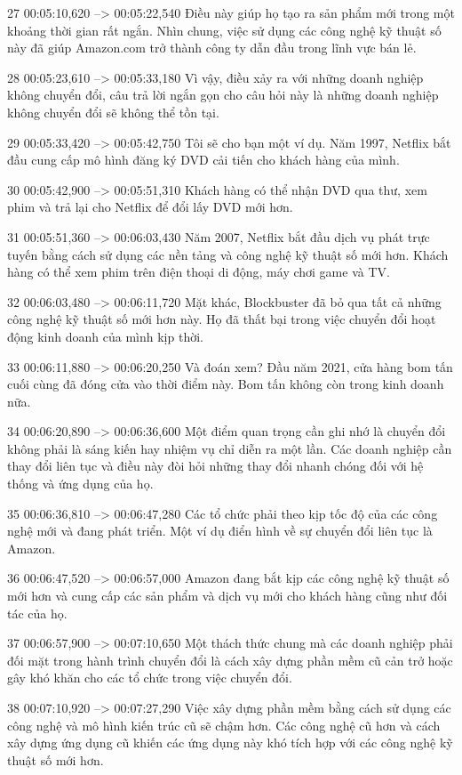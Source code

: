 27
00:05:10,620 --> 00:05:22,540
Điều này giúp họ tạo ra sản phẩm mới trong một khoảng thời gian rất ngắn.  Nhìn chung, việc sử dụng các công nghệ kỹ thuật số này đã giúp Amazon.com trở thành công ty dẫn đầu trong lĩnh vực bán lẻ.

28
00:05:23,610 --> 00:05:33,180
Vì vậy, điều xảy ra với những doanh nghiệp không chuyển đổi, câu trả lời ngắn gọn cho câu hỏi này là những doanh nghiệp không chuyển đổi sẽ không thể tồn tại.

29
00:05:33,420 --> 00:05:42,750
Tôi sẽ cho bạn một ví dụ.  Năm 1997, Netflix bắt đầu cung cấp mô hình đăng ký DVD cải tiến cho khách hàng của mình.

30
00:05:42,900 --> 00:05:51,310
Khách hàng có thể nhận DVD qua thư, xem phim và trả lại cho Netflix để đổi lấy DVD mới hơn.

31
00:05:51,360 --> 00:06:03,430
Năm 2007, Netflix bắt đầu dịch vụ phát trực tuyến bằng cách sử dụng các nền tảng và công nghệ kỹ thuật số mới hơn.  Khách hàng có thể xem phim trên điện thoại di động, máy chơi game và TV.

32
00:06:03,480 --> 00:06:11,720
Mặt khác, Blockbuster đã bỏ qua tất cả những công nghệ kỹ thuật số mới hơn này.  Họ đã thất bại trong việc chuyển đổi hoạt động kinh doanh của mình kịp thời.

33
00:06:11,880 --> 00:06:20,250
Và đoán xem?  Đầu năm 2021, cửa hàng bom tấn cuối cùng đã đóng cửa vào thời điểm này.  Bom tấn không còn trong kinh doanh nữa.

34
00:06:20,890 --> 00:06:36,600
Một điểm quan trọng cần ghi nhớ là chuyển đổi không phải là sáng kiến ​​hay nhiệm vụ chỉ diễn ra một lần.  Các doanh nghiệp cần thay đổi liên tục và điều này đòi hỏi những thay đổi nhanh chóng đối với hệ thống và ứng dụng của họ.

35
00:06:36,810 --> 00:06:47,280
Các tổ chức phải theo kịp tốc độ của các công nghệ mới và đang phát triển.  Một ví dụ điển hình về sự chuyển đổi liên tục là Amazon.

36
00:06:47,520 --> 00:06:57,000
Amazon đang bắt kịp các công nghệ kỹ thuật số mới hơn và cung cấp các sản phẩm và dịch vụ mới cho khách hàng cũng như đối tác của họ.

37
00:06:57,900 --> 00:07:10,650
Một thách thức chung mà các doanh nghiệp phải đối mặt trong hành trình chuyển đổi là cách xây dựng phần mềm cũ cản trở hoặc gây khó khăn cho các tổ chức trong việc chuyển đổi.

38
00:07:10,920 --> 00:07:27,290
Việc xây dựng phần mềm bằng cách sử dụng các công nghệ và mô hình kiến ​​trúc cũ sẽ chậm hơn.  Các công nghệ cũ hơn và cách xây dựng ứng dụng cũ khiến các ứng dụng này khó tích hợp với các công nghệ kỹ thuật số mới hơn.

